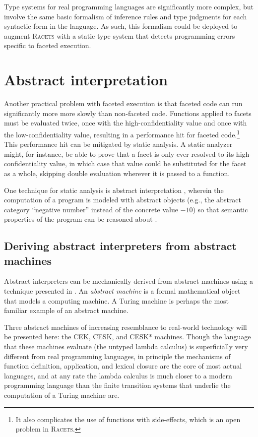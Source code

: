 \documentclass{article}
\begin{document}
Type systems for real programming languages are significantly more complex, but involve the same basic formalism of inference rules and type judgments for each syntactic form in the language. As such, this formalism could be deployed to augment \textsc{Racets} with a static type system that detects programming errors specific to faceted execution.



\section{Abstract interpretation\label{sec:ai}}
Another practical problem with faceted execution is that faceted code can run significantly more more slowly than non-faceted code. Functions applied to facets must be evaluated twice, once with the high-confidentiality value and once with the low-confidentiality value, resulting in a performance hit for faceted code.\footnote{It also complicates the use of functions with side-effects, which is an open problem in \textsc{Racets}.} This performance hit can be mitigated by static analysis. A static analyzer might, for instance, be able to prove that a facet is only ever resolved to its high-confidentiality value, in which case that value could be substituted for the facet as a whole, skipping double evaluation wherever it is passed to a function.

One technique for static analysis is abstract interpretation \cite{abstract-inter}, wherein the computation of a program is modeled with abstract objects (e.g., the abstract category ``negative number'' instead of the concrete value $-10$) so that semantic properties of the program can be reasoned about \cite{ai-original}.



\subsection{Deriving abstract interpreters from abstract machines}
Abstract interpreters can be mechanically derived from abstract machines using a technique presented in \cite{aam}. An \textit{abstract machine} is a formal mathematical object that models a computing machine. A Turing machine is perhaps the most familiar example of an abstract machine.

Three abstract machines of increasing resemblance to real-world technology will be presented here: the CEK, CESK, and CESK* machines. Though the language that these machines evaluate (the untyped lambda calculus) is superficially very different from real programming languages, in principle the mechanisms of function definition, application, and lexical closure are the core of most actual languages, and at any rate the lambda calculus is much closer to a modern programming language than the finite transition systems that underlie the computation of a Turing machine are.
\end{document}
